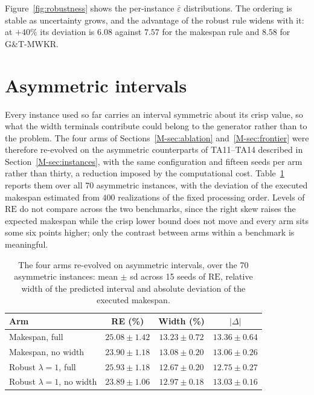 \documentclass[11pt]{article}
\newcommand{\RE}{\mathrm{RE}}
\begin{document}
Figure~\ref{fig:robustness} shows the per-instance $\bar\varepsilon$
distributions. The ordering is stable as uncertainty grows, and the
advantage of the robust rule widens with it: at $+40\%$ its deviation is
$6.08$ against $7.57$ for the makespan rule and $8.58$ for G\&T-MWKR.

\section{Asymmetric intervals}
\label{sec:asym}

Every instance used so far carries an interval symmetric about its
crisp value, so what the width terminals contribute could belong to the
generator rather than to the problem. The four arms of
Sections~\ref{M-sec:ablation} and~\ref{M-sec:frontier} were therefore
re-evolved on the asymmetric counterparts of TA11--TA14 described in
Section~\ref{M-sec:instances}, with the same configuration and fifteen
seeds per arm rather than thirty, a reduction imposed by the computational cost. Table~\ref{tab:asym} reports them over all 70 asymmetric
instances, with the deviation of the executed makespan estimated from $400$ realizations
of the fixed processing order. Levels of $\RE$ do not compare across the
two benchmarks, since the right skew raises the expected makespan while
the crisp lower bound does not move and every arm sits some six points
higher; only the contrast between arms within a benchmark is meaningful.

\begin{table}[!htb]
\centering\small
\caption{The four arms re-evolved on asymmetric intervals, over the 70
asymmetric instances: mean $\pm$ sd across 15 seeds of $\RE$, relative
width of the predicted interval and absolute deviation of the executed
makespan.}
\label{tab:asym}
\begin{tabular}{lccc}
\toprule
Arm & RE (\%) & Width (\%) & $|\Delta|$ \\
\midrule
Makespan, full & $25.08 \pm 1.42$ & $13.23 \pm 0.72$ & $13.36 \pm 0.64$ \\
Makespan, no width & $23.90 \pm 1.18$ & $13.08 \pm 0.20$ &
$13.06 \pm 0.26$ \\
Robust $\lambda{=}1$, full & $25.93 \pm 1.18$ & $12.67 \pm 0.20$ &
$12.75 \pm 0.27$ \\
Robust $\lambda{=}1$, no width & $23.89 \pm 1.06$ & $12.97 \pm 0.18$ &
$13.03 \pm 0.16$ \\
\bottomrule
\end{tabular}
\end{table}
\end{document}
